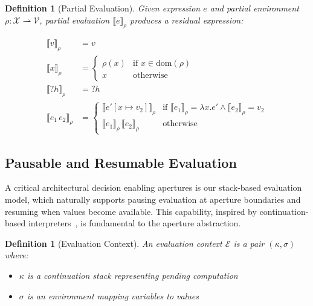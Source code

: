 \documentclass[12pt]{article}
\newtheorem{definition}[theorem]{Definition}
\begin{document}
\begin{definition}[Partial Evaluation]
Given expression $e$ and partial environment $\rho : \mathcal{X} \rightharpoonup \mathcal{V}$, partial evaluation $\llbracket e \rrbracket_\rho$ produces a residual expression:

\begin{align}
\llbracket v \rrbracket_\rho &= v \\
\llbracket x \rrbracket_\rho &= \begin{cases}
    \rho(x) & \text{if } x \in \text{dom}(\rho) \\
    x & \text{otherwise}
\end{cases} \\
\llbracket ?h \rrbracket_\rho &= ?h \\
\llbracket e_1 \, e_2 \rrbracket_\rho &= \begin{cases}
    \llbracket e'[x \mapsto v_2] \rrbracket_\rho & \text{if } \llbracket e_1 \rrbracket_\rho = \lambda x.e' \land \llbracket e_2 \rrbracket_\rho = v_2 \\
    \llbracket e_1 \rrbracket_\rho \, \llbracket e_2 \rrbracket_\rho & \text{otherwise}
\end{cases}
\end{align}
\end{definition}

\subsection{Pausable and Resumable Evaluation}

A critical architectural decision enabling apertures is our stack-based evaluation model, which naturally supports pausing evaluation at aperture boundaries and resuming when values become available. This capability, inspired by continuation-based interpreters~\cite{reynolds1972definitional,friedman1976control}, is fundamental to the aperture abstraction.

\begin{definition}[Evaluation Context]
An evaluation context $\mathcal{E}$ is a pair $(\kappa, \sigma)$ where:
\begin{itemize}
    \item $\kappa$ is a continuation stack representing pending computation
    \item $\sigma$ is an environment mapping variables to values
\end{itemize}
\end{definition}
\end{document}
